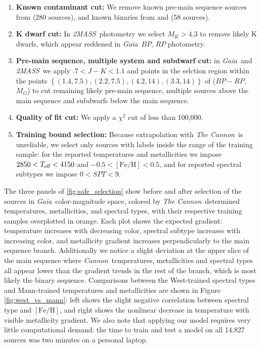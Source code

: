 \documentclass[twocolumn]{aastex62}
\newcommand{\thecannon}{\textsl{The Cannon}}
\newcommand{\cannon}{\textsl{Cannon}}
\newcommand{\gaia}{\textsl{Gaia}}
\newcommand{\zmass}{\textsl{2MASS}}
\newcommand{\feh}{[{\mathrm{Fe}/\mathrm{H}}]}
\begin{document}
\begin{enumerate}
\item \textbf{Known contaminant cut:} We remove known pre-main sequence sources from \citealt{Cottaar:2014} (280 sources), and known binaries from \citealt{ElBadry:2018} and \citealt{Skinner:2018} (58 sources).

\item \textbf{K dwarf cut:} In \zmass\ photometry we select $M_K > 4.3$ to remove likely K dwarfs, which appear reddened in \gaia\ $BP$, $RP$ photometry.

\item \textbf{Pre-main sequence, multiple system and subdwarf cut:} in \gaia\ and \zmass\ we apply $.7<J-K<1.1$ and points in the selction region within the points $\left\{ (1.4, 7.5), (2.2, 7.5), (4.2, 14), (3.3, 14) \right\}$ of ($BP-RP$, $M_G$) to cut remaining likely pre-main sequence, multiple sources above the main sequence and subdwarfs below the main sequence.

\item \textbf{Quality of fit cut:} We apply a $\chi^2$ cut of less than 100,000.

\item \textbf{Training bound selection:} Because extrapolation with \thecannon\ is unreliable, we select only sources with labels inside the range of the training sample: for the reported temperatures and metallicities we impose $2850<T_{\rm eff}<4150$ and $-0.5<\feh<0.5$, and for reported spectral subtypes we impose $0<SPT<9$.
\end{enumerate}

The three panels of \ref{fig:safe_selection} show before and after selection of the sources in \gaia\ color-magnitude space, colored by \thecannon\ determined temperatures, metallicities, and spectral types, with their respective training samples overplotted in orange. Each plot shows the expected gradient: temperature increases with decreasing color, spectral subtype increases with increasing color, and metallicity gradient increases perpendicularly to the main sequence branch. Additionally we notice a slight deviation at the upper slice of the main sequence where \cannon\ temperatures, metallicities and spectral types all appear lower than the gradient trends in the rest of the branch, which is most likely the binary sequence. Comparisons between the West-trained spectral types and Mann-trained temperatures and metallicities are shown in Figure \ref{fig:west_vs_mann}: left shows the slight negative correlation between spectral type and $\feh$, and right shows the nonlinear decrease in temperature with visible metallicity gradient. We also note that applying our model requires very little computational demand: the time to train and test a model on all 14,827 sources was two minutes on a personal laptop. 
\end{document}
